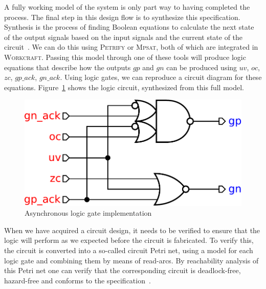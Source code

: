 \documentclass[british,compsoc]{IEEEtran}
\newcommand{\noun}[1]{\textsc{#1}}
\begin{document}

A fully working model of the system is only part way to having completed
the process. The final step in this design flow is to synthesize this
specification. Synthesis is the process of finding Boolean equations to calculate
the next state of the output signals based on the input signals and
the current state of the circuit~\cite{Cortadella}. We can do this
using \noun{Petrify} or \noun{Mpsat}, both of which are integrated
in \noun{Workcraft}. Passing this model through one of these tools
will produce logic equations that describe how the outputs $gp$ and
$gn$ can be produced using $uv$, $oc$, $zc$, $gp\_ack$, $gn\_ack$.
Using logic gates, we can reproduce a circuit diagram for these equations.
Figure~\ref{fig:buck Circuit} shows the logic circuit, synthesized
from this full model.

\begin{figure}[h]
\begin{centering}
\includegraphics[scale=0.3]{Images/circuit-buck}
\par\end{centering}

\protect\caption{\label{fig:buck Circuit}Asynchronous logic gate implementation}
\end{figure}

When we have acquired a circuit design, it needs to be verified to
ensure that the logic will perform as we expected before the circuit
is fabricated. To verify this, the circuit is converted into a so-called
circuit Petri net, using a model for each logic gate and combining
them by means of read-arcs. By reachability analysis of this Petri
net one can verify that the corresponding circuit is deadlock-free,
hazard-free and conforms to the specification~\cite{2008_poliakov_async}.

\end{document}
